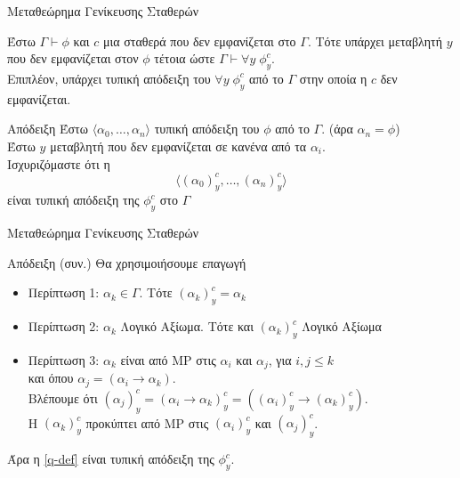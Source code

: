 \documentclass{beamer}
\begin{document}
\begin{frame}{Μεταθεώρημα Γενίκευσης Σταθερών}
  \begin{block}{}
    Έστω $\Gamma \vdash \phi$ και $c$ μια σταθερά που δεν εμφανίζεται στο $\Gamma$. Τότε υπάρχει μεταβλητή $y$ που δεν εμφανίζεται στον $\phi$ τέτοια ώστε $\Gamma \vdash \forall y \; \phi_y^c$.\\
    Επιπλέον, υπάρχει τυπική απόδειξη του $\forall y \; \phi_y^c$ από το $\Gamma$ στην οποία η $c$ δεν εμφανίζεται.
  \end{block}
  \begin{block}{Απόδειξη}
    Έστω $\langle \alpha_0, \ldots, \alpha_n \rangle$ τυπική απόδειξη του $\phi$ από το $\Gamma$. (άρα $\alpha_n= \phi$)\\
    Έστω $y$ μεταβλητή που δεν εμφανίζεται σε κανένα από τα $\alpha_i$.\\
    Ισχυριζόμαστε ότι η
    \begin{equation}
      \label{q-def}
      \langle(\alpha_0)_y^c, \ldots, (\alpha_n)_y^c \rangle
    \end{equation}
    είναι τυπική απόδειξη της $\phi_y^c$ στο $\Gamma$
  \end{block}
\end{frame}

\begin{frame}{Μεταθεώρημα Γενίκευσης Σταθερών}
  \begin{block}{Απόδειξη (συν.)}
  Θα χρησιμοιήσουμε επαγωγή
  \begin{itemize}
    \item Περίπτωση 1: $\alpha_k \in \Gamma$. Τότε $(\alpha_k)_y^c = \alpha_k$
    \item Περίπτωση 2: $\alpha_k$ Λογικό Αξίωμα. Τότε και $(\alpha_k)_y^c$ Λογικό Αξίωμα
    \item Περίπτωση 3: $\alpha_k$ είναι από MP στις $\alpha_i$ και $\alpha_j$, για $i,j \leq k$\\
      και όπου $\alpha_j = (\alpha_i \rightarrow \alpha_k)$.\\
      Βλέπουμε ότι $(\alpha_j)_y^c = (\alpha_i \rightarrow \alpha_k)_y^c = ((\alpha_i)_y^c \rightarrow (\alpha_k)_y^c)$.\\
      Η $(\alpha_k)_y^c$ προκύπτει από MP στις $(\alpha_i)_y^c$ και $(\alpha_j)_y^c$.
  \end{itemize}
  Άρα η \eqref{q-def} είναι τυπική απόδειξη της $\phi_y^c$.
  \end{block}
\end{frame}
\end{document}
